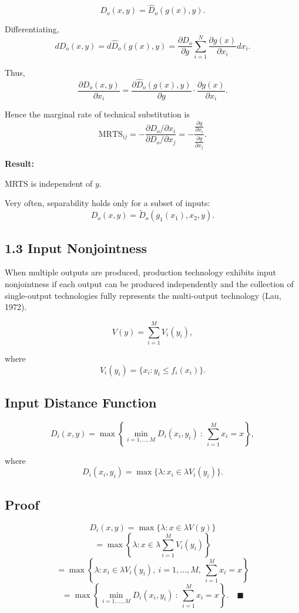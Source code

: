 \[
D_o(x,y)=\hat D_o(g(x),y).
\]

Differentiating,
\[
dD_o(x,y)
=
d\hat D_o(g(x),y)
=
\frac{\partial D_o}{\partial g} \sum_{i=1}^N \frac{\partial g(x)}{\partial x_i} dx_i.
\]

Thus,
\[
\frac{\partial D_o(x,y)}{\partial x_i}
=
\frac{\partial \hat D_o(g(x),y)}{\partial g}
\cdot
\frac{\partial g(x)}{\partial x_i}.
\]

Hence the marginal rate of technical substitution is
\[
\text{MRTS}_{ij}
=
-
\frac{\partial D_o/\partial x_i}{\partial D_o/\partial x_j}
=
-
\frac{\frac{\partial g}{\partial x_i}}{\frac{\partial g}{\partial x_j}}.
\]

\medskip

\textbf{Result:}

MRTS is independent of $y$.

\medskip

Very often, separability holds only for a subset of inputs:
\[
D_o(x,y)=\tilde D_o(g_1(x_1),x_2,y).
\]

\subsection*{1.3 Input Nonjointness}

When multiple outputs are produced, production technology exhibits
input nonjointness if each output can be produced independently
and the collection of single-output technologies fully represents
the multi-output technology (Lau, 1972).

\[
V(y)=\sum_{i=1}^M V_i(y_i),
\]

where
\[
V_i(y_i)=\{x_i : y_i \le f_i(x_i)\}.
\]

\subsection*{Input Distance Function}

\[
D_i(x,y)
=
\max \left\{
\min_{i=1,\dots,M} D_i(x_i,y_i)
\ :\ \sum_{i=1}^M x_i = x
\right\},
\]

where
\[
D_i(x_i,y_i)=\max \{\lambda : x_i \in \lambda V_i(y_i)\}.
\]

\subsection*{Proof}

\[
D_i(x,y)
=
\max \{\lambda : x \in \lambda V(y)\}
\]
\[
=
\max \left\{\lambda : x \in \lambda \sum_{i=1}^M V_i(y_i)\right\}
\]
\[
=
\max \left\{
\lambda :
x_i \in \lambda V_i(y_i),\ i=1,\dots,M,\ \sum_{i=1}^M x_i = x
\right\}
\]
\[
=
\max \left\{
\min_{i=1,\dots,M} D_i(x_i,y_i)
\ :\ \sum_{i=1}^M x_i = x
\right\}.
\quad \blacksquare
\]

